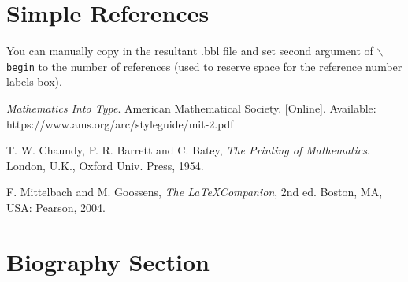 \documentclass[lettersize,journal]{IEEEtran}
\begin{document}
%
%
\section{Simple References}
You can manually copy in the resultant .bbl file and set second argument of $\backslash${\tt{begin}} to the number of references
 (used to reserve space for the reference number labels box).

\begin{thebibliography}{1}


{\it{Mathematics Into Type}}. American Mathematical Society. [Online]. Available: https://www.ams.org/arc/styleguide/mit-2.pdf

T. W. Chaundy, P. R. Barrett and C. Batey, {\it{The Printing of Mathematics}}. London, U.K., Oxford Univ. Press, 1954.

F. Mittelbach and M. Goossens, {\it{The \LaTeX Companion}}, 2nd ed. Boston, MA, USA: Pearson, 2004.

\end{thebibliography}


\newpage

\section{Biography Section}

\vspace{11pt}


\vspace{11pt}

\vfill
\end{document}
